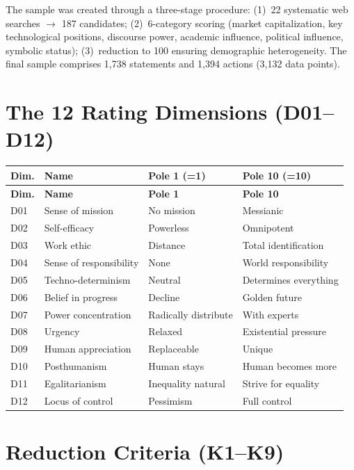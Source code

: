 \documentclass[12pt,a4paper]{article}
\begin{document}
The sample was created through a three-stage procedure: (1)~22 systematic web searches $\to$ 187 candidates; (2)~6-category scoring (market capitalization, key technological positions, discourse power, academic influence, political influence, symbolic status); (3)~reduction to 100 ensuring demographic heterogeneity. The final sample comprises 1,738 statements and 1,394 actions (3,132 data points).


\section{The 12 Rating Dimensions (D01--D12)}
\label{app:dimensionen}

\begin{longtable}{l l l l}
  \toprule
  \textbf{Dim.} & \textbf{Name} & \textbf{Pole 1 (=1)} & \textbf{Pole 10 (=10)} \\
  \midrule
  \endfirsthead
  \toprule
  \textbf{Dim.} & \textbf{Name} & \textbf{Pole 1} & \textbf{Pole 10} \\
  \midrule
  \endhead
  D01 & Sense of mission & No mission & Messianic \\
  D02 & Self-efficacy & Powerless & Omnipotent \\
  D03 & Work ethic & Distance & Total identification \\
  D04 & Sense of responsibility & None & World responsibility \\
  D05 & Techno-determinism & Neutral & Determines everything \\
  D06 & Belief in progress & Decline & Golden future \\
  D07 & Power concentration & Radically distribute & With experts \\
  D08 & Urgency & Relaxed & Existential pressure \\
  D09 & Human appreciation & Replaceable & Unique \\
  D10 & Posthumanism & Human stays & Human becomes more \\
  D11 & Egalitarianism & Inequality natural & Strive for equality \\
  D12 & Locus of control & Pessimism & Full control \\
  \bottomrule
\end{longtable}


\section{Reduction Criteria (K1--K9)}
\label{app:reduktion}
\end{document}
